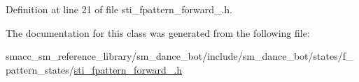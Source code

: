 Definition at line 21 of file sti\+\_\+fpattern\+\_\+forward\+\_.\+h.




The documentation for this class was generated from the following file\+:\begin{DoxyCompactItemize}
\item 
smacc\+\_\+sm\+\_\+reference\+\_\+library/sm\+\_\+dance\+\_\+bot/include/sm\+\_\+dance\+\_\+bot/states/f\+\_\+pattern\+\_\+states/\hyperlink{sti__fpattern__forward__1_8h}{sti\+\_\+fpattern\+\_\+forward\+\_.\+h}\end{DoxyCompactItemize}
